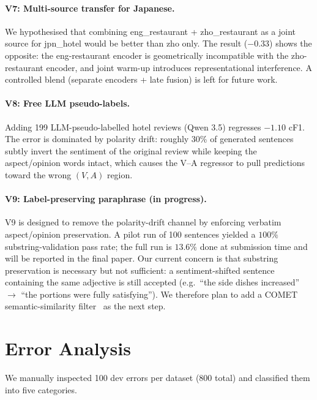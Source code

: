 \documentclass[runningheads]{llncs}
\begin{document}
\paragraph{V7: Multi-source transfer for Japanese.}
We hypothesised that combining eng\_restaurant + zho\_restaurant as a
joint source for jpn\_hotel would be better than zho only. The result
($-0.33$) shows the opposite: the eng-restaurant encoder is
geometrically incompatible with the zho-restaurant encoder, and joint
warm-up introduces representational interference. A controlled blend
(separate encoders + late fusion) is left for future work.

\paragraph{V8: Free LLM pseudo-labels.}
Adding 199 LLM-pseudo-labelled hotel reviews (Qwen 3.5) regresses
$-1.10$ cF1. The error is dominated by polarity drift: roughly 30\%
of generated sentences subtly invert the sentiment of the original
review while keeping the aspect/opinion words intact, which causes
the V--A regressor to pull predictions toward the wrong $(V,A)$
region.

\paragraph{V9: Label-preserving paraphrase (in progress).}
V9 is designed to remove the polarity-drift channel by enforcing
verbatim aspect/opinion preservation. A pilot run of 100 sentences
yielded a $100\%$ substring-validation pass rate; the full run is
$13.6\%$ done at submission time and will be reported in the final
paper. Our current concern is that substring preservation is necessary
but not sufficient: a sentiment-shifted sentence containing the same
adjective is still accepted (e.g.\ ``the side dishes increased'' $\to$
``the portions were fully satisfying''). We therefore plan to add a
COMET semantic-similarity filter~\cite{rei2022comet} as the next step.

\section{Error Analysis}
\label{sec:error}

We manually inspected 100 dev errors per dataset (800 total) and
classified them into five categories.
\end{document}
